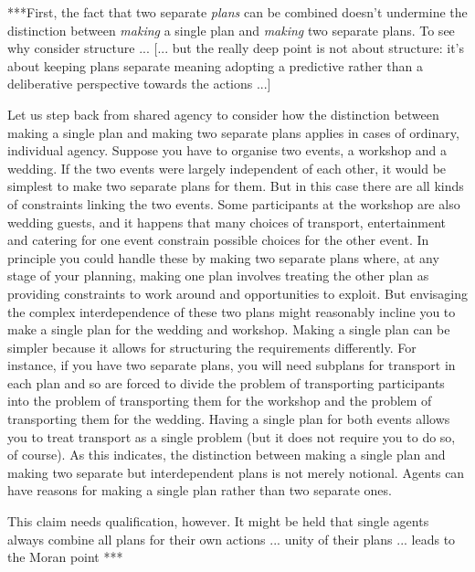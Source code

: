 \documentclass[12pt,\papersize]{extarticle}
\begin{document}
***First,
the fact that two separate \emph{plans} can be combined doesn't undermine the distinction between \emph{making} a single plan and \emph{making} two separate plans.
To see why consider structure ...
[... but the really deep point is not about structure: it's about keeping plans separate meaning adopting a predictive rather than a deliberative perspective towards the actions ...]

Let us step back from shared agency  
 to consider how 
 the distinction between making a single plan and making two separate plans
  applies in cases of ordinary, individual agency.
Suppose you have to organise two events, a workshop and a wedding.
If the two events were largely independent of each other,
it would be simplest to make two separate plans for them.
But in this case there are all kinds of constraints linking the two events.
Some participants at the workshop are also wedding guests,
and it happens that many choices of transport, entertainment and catering for one event constrain possible choices for the other event.
In principle you could handle these by making two separate plans where, at any stage of your planning, making one plan involves treating the other plan as providing constraints to work around and opportunities to exploit.
But envisaging the complex interdependence of these two plans  
might reasonably incline you to make a single plan for the wedding and workshop.
Making a single plan can be simpler because it allows for structuring the requirements differently.
For instance, if you have two separate plans, you will need subplans for transport in each plan and so are forced to divide the problem of transporting participants into the problem of transporting them for the workshop and the problem of transporting them for the wedding.
Having a single plan for both events allows you to treat transport as a single problem (but it does not require you to do so, of course).
As this indicates, the distinction between making a single plan and making two separate but interdependent plans is not merely notional.
Agents can have reasons for making a single plan rather than two separate ones.

This claim needs qualification, however.
It might be held that single agents always combine all plans for their own actions ... unity of their plans ... leads to the Moran point ***

 
 
\end{document}

